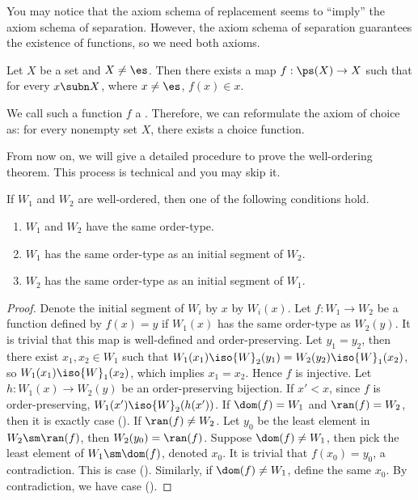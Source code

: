 \documentclass[10pt]{article}
\begin{document}
\par
You may notice that the axiom schema of replacement seems to ``imply'' the axiom schema of separation. However, the axiom schema of separation guarantees the existence of functions, so we need both axioms.
\begin{Axiom of choice}
    Let $X$ be a set and $X\ne\es$. Then there exists a map $f:\ps(X)\to X$ such that for every $x\subn X$, where $x\ne\es$, $f(x)\in x$. 
\end{Axiom of choice}
\par
We call such a function $f$ a . Therefore, we can reformulate the axiom of choice as: for every nonempty set $X$, there exists a choice function.
\par
From now on, we will give a detailed procedure to prove the well-ordering theorem. This process is technical and you may skip it.
\begin{proposition}
    If ${W}_{1}$ and ${W}_{2}$ are well-ordered, then one of the following conditions hold.
    \begin{enumerate}
        \item ${W}_{1}$ and ${W}_{2}$ have the same order-type.
        \item ${W}_{1}$ has the same order-type as an initial segment of ${W}_{2}$.
        \item ${W}_{2}$ has the same order-type as an initial segment of ${W}_{1}$.
    \end{enumerate}
\end{proposition}
\begin{proof}
    Denote the initial segment of ${W}_{i}$ by $x$ by ${W}_{i}(x)$. Let $f:{W}_{1}\to{W}_{2}$ be a function defined by $f(x)=y$ if ${W}_{1}(x)$ has the same order-type as ${W}_{2}(y)$. It is trivial that this map is well-defined and order-preserving. Let ${y}_{1}={y}_{2}$, then there exist ${x}_{1},{x}_{2}\in{W}_{1}$ such that ${W}_{1}({x}_{1})\iso{W}_{2}({y}_{1})={W}_{2}({y}_{2})\iso{W}_{1}({x}_{2})$, so ${W}_{1}({x}_{1})\iso{W}_{1}({x}_{2})$, which implies ${x}_{1}={x}_{2}$. Hence $f$ is injective. Let $h:{W}_{1}(x)\to{W}_{2}(y)$ be an order-preserving bijection. If $x'<x$, since $f$ is order-preserving, ${W}_{1}(x')\iso{W}_{2}(h(x'))$. If $\dom(f)={W}_{1}$ and $\ran(f)={W}_{2}$, then it is exactly case (). If $\ran(f)\ne{W}_{2}$. Let ${y}_{0}$ be the least element in ${W}_{2}\sm\ran(f)$, then ${W}_{2}({y}_{0})=\ran(f)$. Suppose $\dom(f)\ne{W}_{1}$, then pick the least element of ${W}_{1}\sm\dom(f)$, denoted ${x}_{0}$. It is trivial that $f({x}_{0})={y}_{0}$, a contradiction. This is case (). Similarly, if $\dom(f)\ne{W}_{1}$, define the same ${x}_{0}$. By contradiction, we have case ().
\end{proof}
\end{document}
